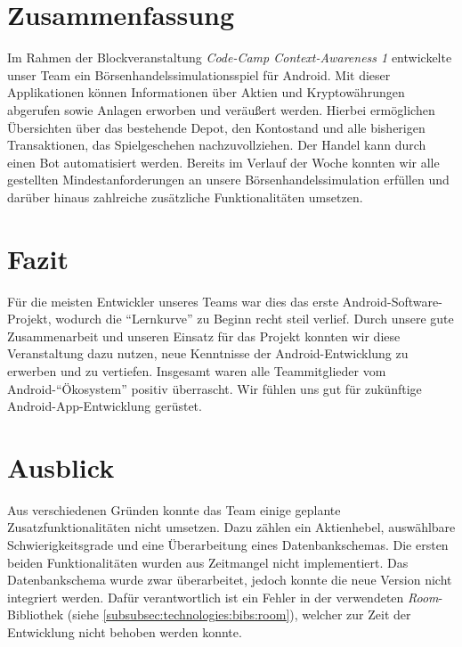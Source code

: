 \documentclass[a4paper]{article}
\begin{document}
\section{Zusammenfassung}
\label{sec:summary}
Im Rahmen der Blockveranstaltung \textit{Code-Camp Context-Awareness 1} entwickelte unser Team ein Börsenhandelssimulationsspiel für Android. Mit dieser Applikationen können Informationen über Aktien und Kryptowährungen abgerufen sowie Anlagen erworben und veräußert werden. Hierbei ermöglichen Übersichten über das bestehende Depot, den Kontostand und alle bisherigen Transaktionen, das Spielgeschehen nachzuvollziehen. Der Handel kann durch einen Bot automatisiert werden. \newline
Bereits im Verlauf der Woche konnten wir alle gestellten Mindestanforderungen an unsere Börsenhandelssimulation erfüllen und darüber hinaus zahlreiche zusätzliche Funktionalitäten umsetzen.


\section{Fazit}
\label{sec:conclusion}
Für die meisten Entwickler unseres Teams war dies das erste Android-Software-Projekt, wodurch die "`Lernkurve"' zu Beginn recht steil verlief. Durch unsere gute Zusammenarbeit und unseren Einsatz für das Projekt konnten wir diese Veranstaltung dazu nutzen, neue Kenntnisse der Android-Entwicklung zu erwerben und zu vertiefen. Insgesamt waren alle Teammitglieder vom Android-"`Ökosystem"' positiv überrascht. Wir fühlen uns gut für zukünftige Android-App-Entwicklung gerüstet.


\section{Ausblick}
\label{sec:outlook}
Aus verschiedenen Gründen konnte das Team einige geplante Zusatzfunktionalitäten nicht umsetzen.
Dazu zählen ein Aktienhebel, auswählbare Schwierigkeitsgrade und eine Überarbeitung eines Datenbankschemas.
Die ersten beiden Funktionalitäten wurden aus Zeitmangel nicht implementiert.
Das Datenbankschema wurde zwar überarbeitet, jedoch konnte die neue Version nicht integriert werden.
Dafür verantwortlich ist ein Fehler in der verwendeten \textit{Room}-Bibliothek (siehe \autoref{subsubsec:technologies:bibs:room}), welcher zur Zeit der Entwicklung nicht behoben werden konnte.

\begingroup
\raggedright
\printbibliography[title={Referenzen}]
\endgroup
\end{document}
